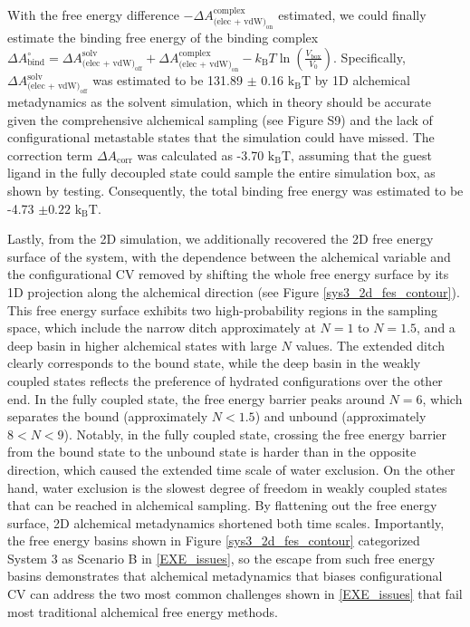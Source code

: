 \documentclass[journal=jacsat,manuscript=article]{achemso}
\begin{document}
With the free energy difference $-\Delta A^{\text{complex}}_{\text{(elec + vdW)}_{\text{on}}}$ estimated, we could finally estimate the binding free energy of the binding complex 
$\Delta A^{\circ}_{\text{bind}} = \Delta A^{\text{solv}}_{\text{(elec + vdW)}_{\text{off}}} + \Delta A^{\text{complex}}_{\text{(elec + vdW)}_{\text{on}}} - k_{\text{B}}T \ln \left(\frac{V_{\text{box}}}{V_{0}}\right)$. Specifically, $\Delta A^{\text{solv}}_{\text{(elec + vdW)}_{\text{off}}}$ was estimated to be 131.89 $\pm$ 0.16 $\text{k}_{\text{B}}\text{T}$ by 1D alchemical metadynamics as the solvent simulation, which in theory should be accurate given the comprehensive alchemical sampling (see Figure S9) and the lack of configurational metastable states that the simulation could have missed. The correction term $\Delta A_{\text{corr}}$ was calculated as -3.70 $\text{k}_{\text{B}}\text{T}$, assuming that the guest ligand in the fully decoupled state could sample the entire simulation box, as shown by testing. Consequently, the total binding free energy was estimated to be -4.73 $\pm 0.22$ $\text{k}_{\text{B}}\text{T}$.

Lastly, from the 2D simulation, we additionally recovered the 2D free energy surface of the system, with the dependence between the alchemical variable and the configurational CV removed by shifting the whole free energy surface by its 1D projection along the alchemical direction (see Figure \ref{sys3_2d_fes_contour}). This free energy surface exhibits two high-probability regions in the sampling space, which include the narrow ditch approximately at $N=1$ to $N=1.5$, and a deep basin in higher alchemical states with large $N$ values. The extended ditch clearly corresponds to the bound state, while the deep basin in the weakly coupled states reflects the preference of hydrated configurations over the other end. In the fully coupled state, the free energy barrier peaks around $N=6$, which separates the bound (approximately $N<1.5$) and unbound (approximately $8 < N < 9$). Notably, in the fully coupled state, crossing the free energy barrier from the bound state to the unbound state is harder than in the opposite direction, which caused the extended time scale of water exclusion. On the other hand, water exclusion is the slowest degree of freedom in weakly coupled states that can be reached in alchemical sampling. By flattening out the free energy surface, 2D alchemical metadynamics shortened both time scales. Importantly, the free energy basins shown in Figure \ref{sys3_2d_fes_contour} categorized System 3 as Scenario B in \ref{EXE_issues}, so the escape from such free energy basins demonstrates that alchemical metadynamics that biases configurational CV can address the two most common challenges shown in \ref{EXE_issues} that fail most traditional alchemical free energy methods.
\end{document}
